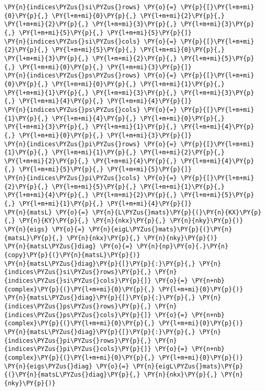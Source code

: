 \begin{Verbatim}[commandchars=\\\{\}]
\PY{n}{indices\PYZus{}si\PYZus{}rows} \PY{o}{=} \PY{p}{[}\PY{l+m+mi}{0}\PY{p}{,} \PY{l+m+mi}{0}\PY{p}{,} \PY{l+m+mi}{2}\PY{p}{,} \PY{l+m+mi}{2}\PY{p}{,} \PY{l+m+mi}{3}\PY{p}{,} \PY{l+m+mi}{3}\PY{p}{,} \PY{l+m+mi}{5}\PY{p}{,} \PY{l+m+mi}{5}\PY{p}{]}
\PY{n}{indices\PYZus{}si\PYZus{}cols} \PY{o}{=} \PY{p}{[}\PY{l+m+mi}{2}\PY{p}{,} \PY{l+m+mi}{5}\PY{p}{,} \PY{l+m+mi}{0}\PY{p}{,} \PY{l+m+mi}{3}\PY{p}{,} \PY{l+m+mi}{2}\PY{p}{,} \PY{l+m+mi}{5}\PY{p}{,} \PY{l+m+mi}{0}\PY{p}{,} \PY{l+m+mi}{3}\PY{p}{]}
\PY{n}{indices\PYZus{}ps\PYZus{}rows} \PY{o}{=} \PY{p}{[}\PY{l+m+mi}{0}\PY{p}{,} \PY{l+m+mi}{0}\PY{p}{,} \PY{l+m+mi}{1}\PY{p}{,} \PY{l+m+mi}{1}\PY{p}{,} \PY{l+m+mi}{3}\PY{p}{,} \PY{l+m+mi}{3}\PY{p}{,} \PY{l+m+mi}{4}\PY{p}{,} \PY{l+m+mi}{4}\PY{p}{]}
\PY{n}{indices\PYZus{}ps\PYZus{}cols} \PY{o}{=} \PY{p}{[}\PY{l+m+mi}{1}\PY{p}{,} \PY{l+m+mi}{4}\PY{p}{,} \PY{l+m+mi}{0}\PY{p}{,} \PY{l+m+mi}{3}\PY{p}{,} \PY{l+m+mi}{1}\PY{p}{,} \PY{l+m+mi}{4}\PY{p}{,} \PY{l+m+mi}{0}\PY{p}{,} \PY{l+m+mi}{3}\PY{p}{]}
\PY{n}{indices\PYZus{}pi\PYZus{}rows} \PY{o}{=} \PY{p}{[}\PY{l+m+mi}{1}\PY{p}{,} \PY{l+m+mi}{1}\PY{p}{,} \PY{l+m+mi}{2}\PY{p}{,} \PY{l+m+mi}{2}\PY{p}{,} \PY{l+m+mi}{4}\PY{p}{,} \PY{l+m+mi}{4}\PY{p}{,} \PY{l+m+mi}{5}\PY{p}{,} \PY{l+m+mi}{5}\PY{p}{]}
\PY{n}{indices\PYZus{}pi\PYZus{}cols} \PY{o}{=} \PY{p}{[}\PY{l+m+mi}{2}\PY{p}{,} \PY{l+m+mi}{5}\PY{p}{,} \PY{l+m+mi}{1}\PY{p}{,} \PY{l+m+mi}{4}\PY{p}{,} \PY{l+m+mi}{2}\PY{p}{,} \PY{l+m+mi}{5}\PY{p}{,} \PY{l+m+mi}{1}\PY{p}{,} \PY{l+m+mi}{4}\PY{p}{]}
\PY{n}{matsL} \PY{o}{=} \PY{n}{L\PYZus{}mats}\PY{p}{(}\PY{n}{KX}\PY{p}{,} \PY{n}{KY}\PY{p}{,} \PY{n}{nkx}\PY{p}{,} \PY{n}{nky}\PY{p}{)}
\PY{n}{eigs} \PY{o}{=} \PY{n}{eigL\PYZus{}mats}\PY{p}{(}\PY{n}{matsL}\PY{p}{,} \PY{n}{nkx}\PY{p}{,} \PY{n}{nky}\PY{p}{)}
\PY{n}{matsL\PYZus{}diag} \PY{o}{=} \PY{n}{np}\PY{o}{.}\PY{n}{copy}\PY{p}{(}\PY{n}{matsL}\PY{p}{)}
\PY{n}{matsL\PYZus{}diag}\PY{p}{[}\PY{p}{:}\PY{p}{,} \PY{n}{indices\PYZus{}si\PYZus{}rows}\PY{p}{,} \PY{n}{indices\PYZus{}si\PYZus{}cols}\PY{p}{]} \PY{o}{=} \PY{n+nb}{complex}\PY{p}{(}\PY{l+m+mi}{0}\PY{p}{,} \PY{l+m+mi}{0}\PY{p}{)}
\PY{n}{matsL\PYZus{}diag}\PY{p}{[}\PY{p}{:}\PY{p}{,} \PY{n}{indices\PYZus{}ps\PYZus{}rows}\PY{p}{,} \PY{n}{indices\PYZus{}ps\PYZus{}cols}\PY{p}{]} \PY{o}{=} \PY{n+nb}{complex}\PY{p}{(}\PY{l+m+mi}{0}\PY{p}{,} \PY{l+m+mi}{0}\PY{p}{)}
\PY{n}{matsL\PYZus{}diag}\PY{p}{[}\PY{p}{:}\PY{p}{,} \PY{n}{indices\PYZus{}pi\PYZus{}rows}\PY{p}{,} \PY{n}{indices\PYZus{}pi\PYZus{}cols}\PY{p}{]} \PY{o}{=} \PY{n+nb}{complex}\PY{p}{(}\PY{l+m+mi}{0}\PY{p}{,} \PY{l+m+mi}{0}\PY{p}{)}
\PY{n}{eigs\PYZus{}diag} \PY{o}{=} \PY{n}{eigL\PYZus{}mats}\PY{p}{(}\PY{n}{matsL\PYZus{}diag}\PY{p}{,} \PY{n}{nkx}\PY{p}{,} \PY{n}{nky}\PY{p}{)}

\end{Verbatim}
